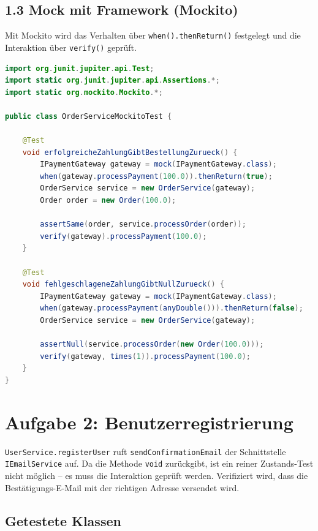 \documentclass[
	fontsize=12pt,          %
	paper=a4,               %
	numbers=noenddot,       %
	listof=totoc,           %
	listof=entryprefix,     %
	listof=nochaptergap,    %
	bibliography=totoc,     %
	parskip=half,           %
	openany                 %
]{scrbook}
\begin{document}
\section*{1.3 Mock mit Framework (Mockito)}

Mit Mockito wird das Verhalten über \texttt{when().thenReturn()} festgelegt und
die Interaktion über \texttt{verify()} geprüft.

\begin{lstlisting}[language=Java]
import org.junit.jupiter.api.Test;
import static org.junit.jupiter.api.Assertions.*;
import static org.mockito.Mockito.*;

public class OrderServiceMockitoTest {

    @Test
    void erfolgreicheZahlungGibtBestellungZurueck() {
        IPaymentGateway gateway = mock(IPaymentGateway.class);
        when(gateway.processPayment(100.0)).thenReturn(true);
        OrderService service = new OrderService(gateway);
        Order order = new Order(100.0);

        assertSame(order, service.processOrder(order));
        verify(gateway).processPayment(100.0);
    }

    @Test
    void fehlgeschlageneZahlungGibtNullZurueck() {
        IPaymentGateway gateway = mock(IPaymentGateway.class);
        when(gateway.processPayment(anyDouble())).thenReturn(false);
        OrderService service = new OrderService(gateway);

        assertNull(service.processOrder(new Order(100.0)));
        verify(gateway, times(1)).processPayment(100.0);
    }
}
\end{lstlisting}


\chapter*{Aufgabe 2: Benutzerregistrierung}

\texttt{UserService.registerUser} ruft \texttt{sendConfirmationEmail} der
Schnittstelle \texttt{IEmailService} auf. Da die Methode \texttt{void}
zurückgibt, ist ein reiner Zustands-Test nicht möglich -- es muss die
Interaktion geprüft werden. Verifiziert wird, dass die Bestätigungs-E-Mail mit
der richtigen Adresse versendet wird.

\section*{Getestete Klassen}
\end{document}
